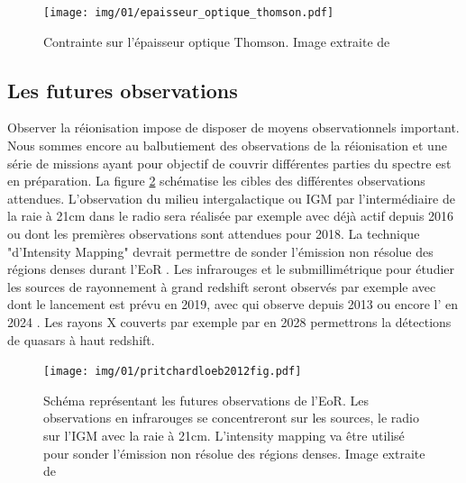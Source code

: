 \begin{figure}
        \texttt{[image: img/01/epaisseur\_optique\_thomson.pdf]} 
        \caption[Epaisseur optique Thomson]{%
		Contrainte sur l'épaisseur optique Thomson.
        Image extraite de \cite{2015ApJ...802L..19R}
 		\label{fig:epaisseur_optique_thomson} }
\end{figure}



\subsection{Les futures observations}



Observer la réionisation impose de disposer de moyens observationnels important.
Nous sommes encore au balbutiement des observations de la réionisation et une série de missions ayant pour objectif de couvrir différentes parties du spectre est en préparation.
La figure \ref{fig:obsn} schématise les cibles des différentes observations attendues.
L'observation du milieu intergalactique ou \ac{IGM} par l'intermédiaire de la raie à 21cm dans le radio sera réalisée par exemple avec \cite{HERA} déjà actif depuis 2016 ou \cite{SKA} dont les premières observations sont attendues pour 2018.
La technique "d'Intensity Mapping" devrait permettre de sonder l’émission non résolue des régions denses durant l'\ac{EoR} \citep{2012ApJ...745...49G}.
Les infrarouges et le submillimétrique pour étudier les sources de rayonnement à grand redshift seront observés par exemple avec \cite{JWST} dont le lancement est prévu en 2019, avec \cite{ALMA} qui observe depuis 2013 ou encore l'\cite{EELT} en 2024 .
Les rayons X couverts par exemple par \cite{ATHENA} en 2028 permettrons la détections de quasars à haut redshift.


\begin{figure}
        \texttt{[image: img/01/pritchardloeb2012fig.pdf]} 
        \caption[Futures observations]{Schéma représentant les futures observations de l'\ac{EoR}.
        Les observations en infrarouges se concentreront sur les sources, le radio sur l'\ac{IGM} avec la raie à 21cm.
        L'intensity mapping va être utilisé pour sonder l'émission non résolue des régions denses.
        Image extraite de \cite{2012RPPh...75h6901P}
 		\label{fig:obsn} }
\end{figure}



